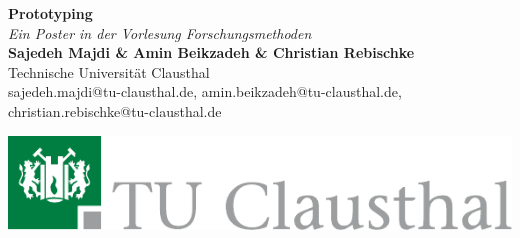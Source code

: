 \documentclass[a0,portrait]{a0poster}
\begin{document}


\begin{minipage}[b]{0.75\linewidth}
\veryHuge \color{Green} \textbf{Prototyping} \color{Black}\\ %
\Huge\textit{Ein Poster in der Vorlesung Forschungsmethoden}\\[2cm] %
    \huge \textbf{Sajedeh Majdi \& Amin Beikzadeh \& Christian Rebischke}\\[0.5cm] %
\huge Technische Universität Clausthal\\[0.4cm] %
\Large sajedeh.majdi@tu-clausthal.de, amin.beikzadeh@tu-clausthal.de, christian.rebischke@tu-clausthal.de\\
\end{minipage}
%
\begin{minipage}[b]{0.25\linewidth}
\includegraphics[width=20cm]{Logo_TUC_de_CMYK.pdf}\\
\end{minipage}

\vspace{1cm} %

\end{document}
